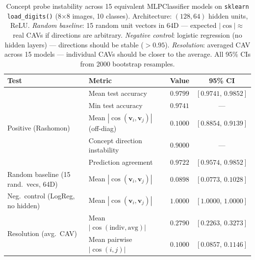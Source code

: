 \begin{table}[t]
\centering
\caption{Concept probe instability across 15 equivalent MLPClassifier models on
\texttt{sklearn} \texttt{load\_digits()} (8$\times$8 images, 10 classes).
Architecture: $(128, 64)$ hidden units, ReLU.
\emph{Random baseline}: 15 random unit vectors in 64D --- expected $|\cos| \approx$ real CAVs if directions are arbitrary.
\emph{Negative control}: logistic regression (no hidden layers) --- directions should be stable ($>0.95$).
\emph{Resolution}: averaged CAV across 15 models --- individual CAVs should be closer to the average.
All 95\% CIs from 2000 bootstrap resamples.}
\label{tab:concept_probe}
\small\begin{tabular}{llcc}
\toprule
\textbf{Test} & \textbf{Metric} & \textbf{Value} & \textbf{95\% CI} \\
\midrule
\multirow{5}{*}{Positive (Rashomon)} & Mean test accuracy & $0.9799$ & $[0.9741,\,0.9852]$ \\
& Min test accuracy & $0.9741$ & --- \\
& Mean $|\cos(\mathbf{v}_i,\mathbf{v}_j)|$ (off-diag) & $0.1000$ & $[0.8854,\,0.9139]$ \\
& Concept direction instability & $0.9000$ & --- \\
& Prediction agreement & $0.9722$ & $[0.9574,\,0.9852]$ \\
\midrule
Random baseline (15 rand.\ vecs, 64D) & Mean $|\cos(\mathbf{v}_i,\mathbf{v}_j)|$ & $0.0898$ & $[0.0773,\,0.1028]$ \\
\midrule
Neg.\ control (LogReg, no hidden) & Mean $|\cos(\mathbf{v}_i,\mathbf{v}_j)|$ & $1.0000$ & $[1.0000,\,1.0000]$ \\
\midrule
\multirow{2}{*}{Resolution (avg.\ CAV)} & Mean $|\cos(\text{indiv},\text{avg})|$ & $0.2790$ & $[0.2263,\,0.3273]$ \\
& Mean pairwise $|\cos(i,j)|$ & $0.1000$ & $[0.0857,\,0.1146]$ \\
\bottomrule
\end{tabular}
\end{table}
